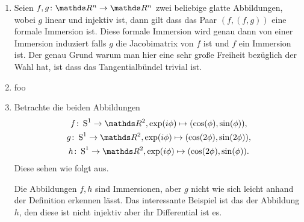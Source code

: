 \begin{Bsp}
	\begin{enumerate}[\textbullet]
	\item Seien $ \abb{f,g}{\R^n}{\R^n} $ zwei beliebige glatte
	Abbildungen, wobei $ g $ linear und injektiv ist, dann gilt dass das Paar $ (f,(f,g)) $ eine formale
	Immersion ist. Diese formale Immersion wird genau dann von
	einer Immersion induziert falls $ g $ die Jacobimatrix von $ f $
	ist und $ f $ ein Immersion ist. Der genau Grund warum man hier eine sehr große Freiheit bezüglich der Wahl hat, ist dass das Tangentialbündel trivial ist. 
	\item foo 
	
	\item Betrachte die beiden Abbildungen 
	\begin{gather*}\label{immBsp}
		\abb{f}{\S^1}{\R^2}, \exp(i\phi)%
		\mapsto (\cos(\phi),\sin(\phi)),\\
		\abb{g}{\S^1}{\R^2}, \exp(i\phi)%
		\mapsto (\cos(2\phi),\sin(2\phi)),\\
		\abb{h}{\S^1}{\R^2}, \exp(i\phi)%
		\mapsto (\cos(2\phi),\sin(\phi)).
	\end{gather*}
	Diese sehen wie folgt aus.\\
	
	Die Abbildungen $f,h$ sind Immersionen, aber $g$ nicht wie sich leicht
	anhand der Definition erkennen lässt. Das interessante Beispiel ist
	das der Abbildung $h$, den diese ist nicht injektiv aber ihr Differential
	ist es.
	\end{enumerate}
\end{Bsp}

